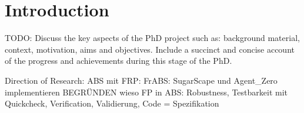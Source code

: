 \section{Introduction}
TODO: Discuss the key aspects of the PhD project such as: background material, context, motivation, aims and objectives. Include a succinct and concise account of the progress and achievements during this stage of the PhD.

Direction of Research:
ABS mit FRP: FrABS: SugarScape und Agent_Zero implementieren
BEGRÜNDEN wieso FP in ABS: Robustness, Testbarkeit mit Quickcheck, Verification, Validierung, Code = Spezifikation